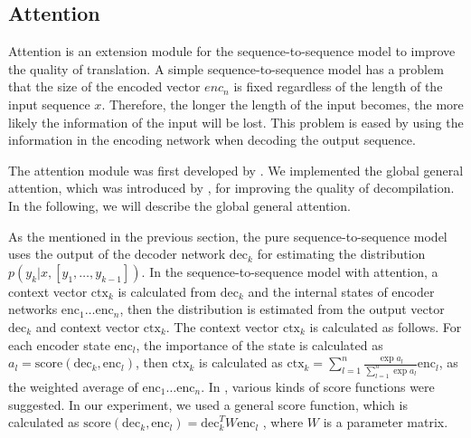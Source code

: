 \documentclass[11pt]{jarticle}
\begin{document}
\subsection{Attention}
Attention is an extension module for the sequence-to-sequence model to improve the quality of translation. 
A simple sequence-to-sequence model has a problem that the size of the encoded vector $enc_{n}$ is fixed 
regardless of the length of the input sequence $x$. 
Therefore, the longer the length of the input becomes, the more likely the information of the input will be lost.
This problem is eased by using the information in the encoding network when decoding the output sequence.

The attention module was first developed by \citet{attention_paper}.
We implemented the global general attention, which was introduced by \citet{dot_attention}, for improving the quality of decompilation.
In the following, we will describe the global general attention.

As the mentioned in the previous section, the pure sequence-to-sequence model uses the output of the decoder network $ \mathrm{dec}_{k} $ for estimating 
the distribution $ p(y_k|x,[y_1,\dots,y_{k-1}]) $.
In the sequence-to-sequence model with attention, 
a context vector $ \mathrm{ctx}_{k} $ is calculated from $ \mathrm{dec}_{k} $ and the internal states of encoder networks $ \mathrm{enc}_{1} \dots \mathrm{enc}_{n} $, 
then the distribution is estimated from the output vector $ \mathrm{dec}_{k} $ and context vector $ \mathrm{ctx}_{k} $.
The context vector $ \mathrm{ctx}_{k} $ is calculated as follows.
For each encoder state $ \mathrm{enc}_{l} $, the importance of the state is calculated as $ a_{l} = \mathrm{score}(\mathrm{dec}_{k},\mathrm{enc}_{l}) $,
then $ \mathrm{ctx}_{k} $ is calculated as $ \mathrm{ctx}_{k} = \sum_{l=1}^{n} \frac{\exp{a_{l}}}{\sum_{l=1}^{n}\exp{a_{l}}} \mathrm{enc}_{l} $, 
as the weighted average of $ \mathrm{enc}_{1} \dots \mathrm{enc}_{n} $.
In \citet{dot_attention}, various kinds of score functions were suggested.
In our experiment, we used a general score function, which is calculated as $ \mathrm{score}(\mathrm{dec}_{k},\mathrm{enc}_{l}) = \mathrm{dec}_{k}^T W \mathrm{enc}_{l} $ ,
where $ W $ is a parameter matrix.


\end{document}
